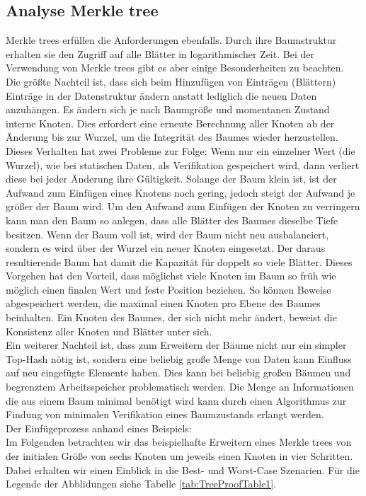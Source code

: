 \subsection{Analyse Merkle tree}
Merkle trees erfüllen die Anforderungen ebenfalls. Durch ihre Baumstruktur erhalten sie den Zugriff auf alle Blätter in logarithmischer Zeit. Bei der Verwendung von Merkle trees gibt es aber einige Besonderheiten zu beachten.\\
Die größte Nachteil ist, dass sich beim Hinzufügen von Einträgen (Blättern) Einträge in der Datenstruktur ändern anstatt lediglich die neuen Daten anzuhängen. Es ändern sich je nach Baumgröße und momentanen Zustand interne Knoten. Dies erfordert eine erneute Berechnung aller Knoten ab der Änderung bis zur Wurzel, um die Integrität des Baumes wieder herzustellen. Dieses Verhalten hat zwei Probleme zur Folge: Wenn nur ein einzelner Wert (die Wurzel), wie bei statischen Daten, als Verifikation gespeichert wird, dann verliert diese bei jeder Änderung ihre Gültigkeit. Solange der Baum klein ist, ist der Aufwand zum Einfügen eines Knotens noch gering, jedoch steigt der Aufwand je größer der Baum wird. Um den Aufwand zum Einfügen der Knoten zu verringern kann man den Baum so anlegen, dass alle Blätter des Baumes dieselbe Tiefe besitzen. Wenn der Baum voll ist, wird der Baum nicht neu ausbalanciert, sondern es wird über der Wurzel ein neuer Knoten eingesetzt. Der daraus resultierende Baum hat damit die Kapazität für doppelt so viele Blätter. Dieses Vorgehen hat den Vorteil, dass möglichst viele Knoten im Baum so früh wie möglich einen finalen Wert und feste Position beziehen. So können Beweise abgespeichert werden, die maximal einen Knoten pro Ebene des Baumes beinhalten. Ein Knoten des Baumes, der sich nicht mehr ändert, beweist die Konsistenz aller Knoten und Blätter unter sich. \\
Ein weiterer Nachteil ist, dass zum Erweitern der Bäume nicht nur ein simpler Top-Hash nötig ist, sondern eine beliebig große Menge von Daten kann Einfluss auf neu eingefügte Elemente haben. Dies kann bei beliebig großen Bäumen und begrenztem Arbeitsspeicher problematisch werden. Die Menge an Informationen die aus einem Baum minimal benötigt wird kann durch einen Algorithmus zur Findung von minimalen Verifikation eines Baumzustands erlangt werden.\cite{8280477} \cite{8280476}\\ 
\clearpage
Der Einfügeprozess anhand eines Beispiels: \\
Im Folgenden betrachten wir das beispielhafte Erweitern eines Merkle trees von der initialen Größe von sechs Knoten um jeweils einen Knoten in vier Schritten. Dabei erhalten wir einen Einblick in die Best- und Worst-Case Szenarien. Für die Legende der Abblidungen siehe Tabelle \ref{tab:TreeProofTable1}.

